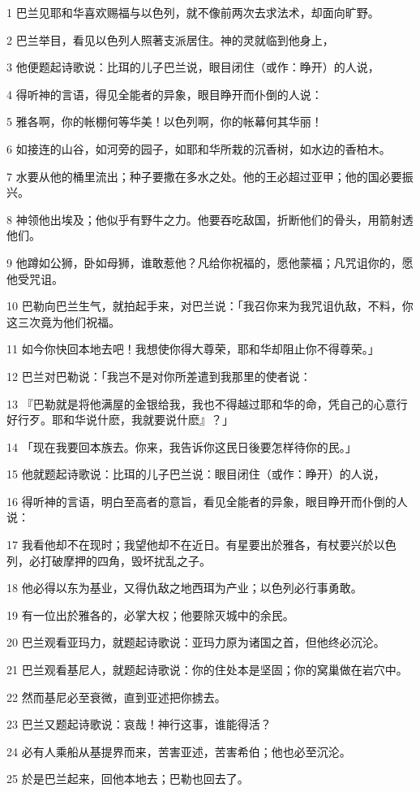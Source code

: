 \par 1 巴兰见耶和华喜欢赐福与以色列，就不像前两次去求法术，却面向旷野。
\par 2 巴兰举目，看见以色列人照著支派居住。神的灵就临到他身上，
\par 3 他便题起诗歌说：比珥的儿子巴兰说，眼目闭住（或作：睁开）的人说，
\par 4 得听神的言语，得见全能者的异象，眼目睁开而仆倒的人说：
\par 5 雅各啊，你的帐棚何等华美！以色列啊，你的帐幕何其华丽！
\par 6 如接连的山谷，如河旁的园子，如耶和华所栽的沉香树，如水边的香柏木。
\par 7 水要从他的桶里流出；种子要撒在多水之处。他的王必超过亚甲；他的国必要振兴。
\par 8 神领他出埃及；他似乎有野牛之力。他要吞吃敌国，折断他们的骨头，用箭射透他们。
\par 9 他蹲如公狮，卧如母狮，谁敢惹他？凡给你祝福的，愿他蒙福；凡咒诅你的，愿他受咒诅。
\par 10 巴勒向巴兰生气，就拍起手来，对巴兰说：「我召你来为我咒诅仇敌，不料，你这三次竟为他们祝福。
\par 11 如今你快回本地去吧！我想使你得大尊荣，耶和华却阻止你不得尊荣。」
\par 12 巴兰对巴勒说：「我岂不是对你所差遣到我那里的使者说：
\par 13 『巴勒就是将他满屋的金银给我，我也不得越过耶和华的命，凭自己的心意行好行歹。耶和华说什麽，我就要说什麽』？」
\par 14 「现在我要回本族去。你来，我告诉你这民日後要怎样待你的民。」
\par 15 他就题起诗歌说：比珥的儿子巴兰说：眼目闭住（或作：睁开）的人说，
\par 16 得听神的言语，明白至高者的意旨，看见全能者的异象，眼目睁开而仆倒的人说：
\par 17 我看他却不在现时；我望他却不在近日。有星要出於雅各，有杖要兴於以色列，必打破摩押的四角，毁坏扰乱之子。
\par 18 他必得以东为基业，又得仇敌之地西珥为产业；以色列必行事勇敢。
\par 19 有一位出於雅各的，必掌大权；他要除灭城中的余民。
\par 20 巴兰观看亚玛力，就题起诗歌说：亚玛力原为诸国之首，但他终必沉沦。
\par 21 巴兰观看基尼人，就题起诗歌说：你的住处本是坚固；你的窝巢做在岩穴中。
\par 22 然而基尼必至衰微，直到亚述把你掳去。
\par 23 巴兰又题起诗歌说：哀哉！神行这事，谁能得活？
\par 24 必有人乘船从基提界而来，苦害亚述，苦害希伯；他也必至沉沦。
\par 25 於是巴兰起来，回他本地去；巴勒也回去了。

